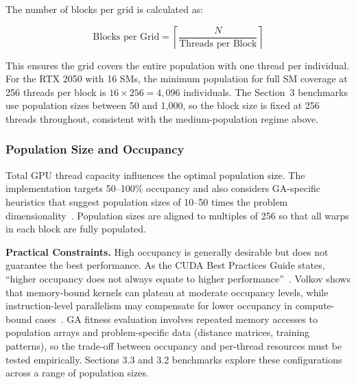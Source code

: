 \documentclass[a4paper,12pt]{article}
\begin{document}
  The number of blocks per grid is calculated as:

  \begin{equation}
      \text{Blocks per Grid} = \left\lceil \frac{N}{\text{Threads per Block}} \right\rceil
  \end{equation}

  This ensures the grid covers the entire population with one thread per individual. For the RTX 2050 with 16 SMs, the minimum population for full SM coverage at 256 threads per block is $16 \times 256 = 4{,}096$ individuals. The Section~3 benchmarks use population sizes between 50 and 1{,}000, so the block size is fixed at 256 threads throughout, consistent with the medium-population regime above.

  \subsubsection*{Population Size and Occupancy}

  Total GPU thread capacity influences the optimal population size. The implementation targets 50--100\% occupancy and also considers GA-specific heuristics that suggest population sizes of 10--50 times the problem dimensionality~\cite{katoch2021review}. Population sizes are aligned to multiples of 256 so that all warps in each block are fully populated.

  \textbf{Practical Constraints.} High occupancy is generally desirable but does not guarantee the best performance. As the CUDA Best Practices Guide states, ``higher occupancy does not always equate to higher performance''~\cite{nvidia2024cuda}. Volkov shows that memory-bound kernels can plateau at moderate occupancy levels, while instruction-level parallelism may compensate for lower occupancy in compute-bound cases~\cite{volkov2010occupancy}. GA fitness evaluation involves repeated memory accesses to population arrays and problem-specific data (distance matrices, training patterns), so the trade-off between occupancy and per-thread resources must be tested empirically. Sections 3.3 and 3.2 benchmarks explore these configurations across a range of population sizes.

  
\end{document}
